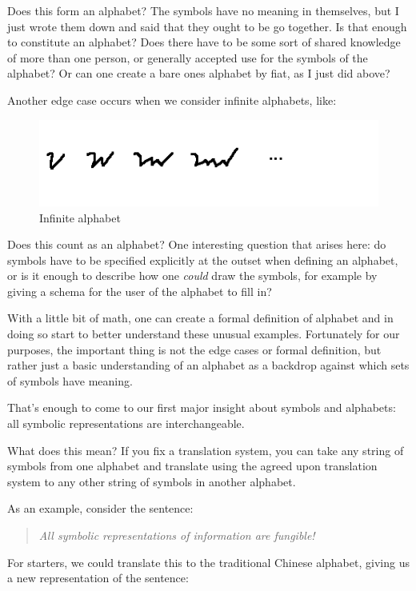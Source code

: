 \documentclass[UTF8]{book}
\begin{document}
\begin{CJK}{UTF8}{gbsn}
Does this form an alphabet? The symbols have no meaning in themselves, but I just wrote them down and said that they ought to be go together. Is that enough to constitute an alphabet? Does there have to be some sort of shared knowledge of more than one person, or generally accepted use for the symbols of the alphabet? Or can one create a bare ones alphabet by fiat, as I just did above?

Another edge case occurs when we consider infinite alphabets, like:

\begin{figure}[H]
\centering
\includegraphics[width=0.8\linewidth]{infinite-alphabet}
\caption{Infinite alphabet}
\end{figure}

Does this count as an alphabet? One interesting question that arises here: do symbols have to be specified explicitly at the outset when defining an alphabet, or is it enough to describe how one \emph{could} draw the symbols, for example by giving a schema for the user of the alphabet to fill in?

With a little bit of math, one can create a formal definition of alphabet and in doing so start to better understand these unusual examples. Fortunately for our purposes, the important thing is not the edge cases or formal definition, but rather just a basic understanding of an alphabet as a backdrop against which sets of symbols have meaning.

That's enough to come to our first major insight about symbols and alphabets: all symbolic representations are interchangeable.

What does this mean? If you fix a translation system, you can take any string of symbols from one alphabet and translate using the agreed upon translation system to any other string of symbols in another alphabet.

As an example, consider the sentence:

\begin{quotation}
\centering
\emph{All symbolic representations of information are fungible!}
\end{quotation}

For starters, we could translate this to the traditional Chinese alphabet, giving us a new representation of the sentence:


\end{CJK}
\end{document}
